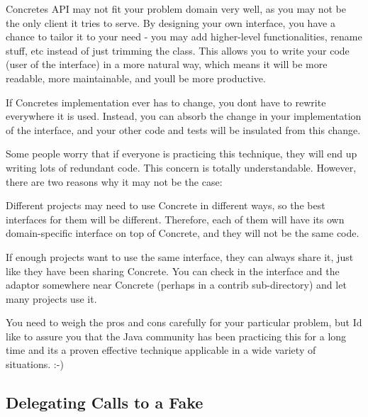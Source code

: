 \begin{DoxyItemize}
\item {\ttfamily Concrete}\textquotesingle{}s A\+PI may not fit your problem domain very well, as you may not be the only client it tries to serve. By designing your own interface, you have a chance to tailor it to your need -\/ you may add higher-\/level functionalities, rename stuff, etc instead of just trimming the class. This allows you to write your code (user of the interface) in a more natural way, which means it will be more readable, more maintainable, and you\textquotesingle{}ll be more productive.
\item If {\ttfamily Concrete}\textquotesingle{}s implementation ever has to change, you don\textquotesingle{}t have to rewrite everywhere it is used. Instead, you can absorb the change in your implementation of the interface, and your other code and tests will be insulated from this change.
\end{DoxyItemize}

Some people worry that if everyone is practicing this technique, they will end up writing lots of redundant code. This concern is totally understandable. However, there are two reasons why it may not be the case\+:


\begin{DoxyItemize}
\item Different projects may need to use {\ttfamily Concrete} in different ways, so the best interfaces for them will be different. Therefore, each of them will have its own domain-\/specific interface on top of {\ttfamily Concrete}, and they will not be the same code.
\item If enough projects want to use the same interface, they can always share it, just like they have been sharing {\ttfamily Concrete}. You can check in the interface and the adaptor somewhere near {\ttfamily Concrete} (perhaps in a {\ttfamily contrib} sub-\/directory) and let many projects use it.
\end{DoxyItemize}

You need to weigh the pros and cons carefully for your particular problem, but I\textquotesingle{}d like to assure you that the Java community has been practicing this for a long time and it\textquotesingle{}s a proven effective technique applicable in a wide variety of situations. \+:-\/)

\subsection*{Delegating Calls to a Fake}

